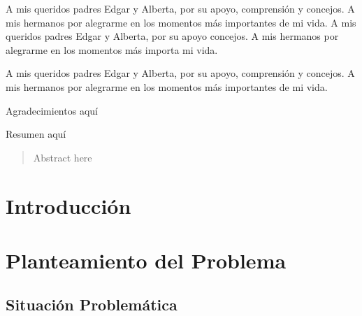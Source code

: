 \documentclass[doc, 12pt, a4paper, draftall]{apa7} %
\begin{document}
\maketitle

\begin{epigraph}
  \hfill {\fontsize{9}{13}\selectfont \hfill A mis queridos padres Edgar y Alberta, por  su apoyo, comprensión y concejos. A mis hermanos por alegrarme en los momentos más importantes de mi vida. A mis queridos padres Edgar y Alberta,  por  su apoyo concejos. A mis hermanos por alegrarme en los momentos más importa mi vida.} 
\end{epigraph}

\frontmatter %

\renewcommand\contentsname{\centering Índice}
\tableofcontents
\newpage
\renewcommand\listtablename{\centering Índice de Tablas}
\listoftables
\newpage
\renewcommand\listfigurename{\centering Índice de Figuras}
\listoffigures
\newpage

\begin{dedication}
 \hfill {\fontsize{8}{13}\selectfont A mis queridos padres Edgar y Alberta,  por  su apoyo, comprensión  y  concejos. A mis hermanos por alegrarme en los momentos más importantes de mi vida.}
\end{dedication}
  
\begin{acknowledgments}
  Agradecimientos aquí
\end{acknowledgments}
  
\begin{resumen}
  Resumen aquí
\end{resumen}
  
\begin{abstract}
  Abstract here
\end{abstract}

\mainmatter %

\section{Introducción}

\lipsum[2]

\section{Planteamiento del Problema}

\subsection{Situación Problemática}
\end{document}
